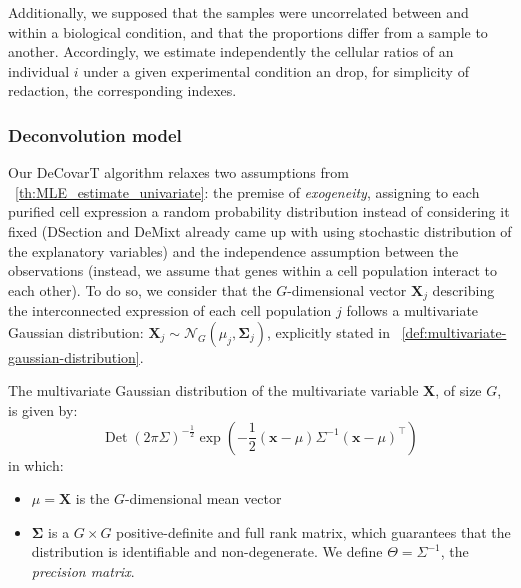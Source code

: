 \documentclass[long, final]{jobim}
\DeclareMathOperator*{\DET}{Det}
\begin{document}
Additionally, we supposed that the samples were uncorrelated between and within a biological condition, and that the proportions differ from a sample to another. Accordingly, we estimate independently the cellular ratios of an individual $i$ under a given experimental condition an drop, for simplicity of redaction, the corresponding indexes.


\subsubsection{Deconvolution model}
\label{subsubsec:deconvolution-model}

Our DeCovarT algorithm relaxes two assumptions from \theoremname~\ref{th:MLE_estimate_univariate}: the premise of \textit{exogeneity}, assigning to each purified cell expression a random probability distribution instead of considering it fixed (DSection \cite{erkkila_etal10} and DeMixt \cite{wang_etal18} already came up with using stochastic distribution of the explanatory variables) and the independence assumption between the observations (instead, we assume that genes within a cell population interact to each other). To do so, we consider that the $G$-dimensional vector $\boldsymbol{X}_{j}$ describing the interconnected expression of each cell population $j$ follows a multivariate Gaussian distribution: $\boldsymbol{X}_{j} \sim \mathcal{N}_G(\mu_{j}, \boldsymbol{\Sigma}_{j})$, explicitly stated in ~\ref{def:multivariate-gaussian-distribution}.

\begin{definition}
\label{def:multivariate-gaussian-distribution}
The multivariate Gaussian distribution of the multivariate variable $\boldsymbol{X}$, of size $G$, is given by:
\begin{equation*}
    \DET(2\pi\Sigma)^{-\frac{1}{2}} \exp\left( -\frac{1}{2} (\boldsymbol{x} - \mu) \Sigma^{-1} (\boldsymbol{x} - \mu)^\top\right)
\end{equation*}
in which:
\begin{itemize}
    \item $\mu=\boldsymbol{X}$ is the $G$-dimensional mean vector
    \item $\boldsymbol{\Sigma}$ is a $G\times G$ positive-definite and full rank matrix, which guarantees that the distribution is identifiable and non-degenerate. We define $\Theta=\Sigma^{-1}$, the \textit{precision matrix}.
\end{itemize}
\end{definition}
\end{document}
